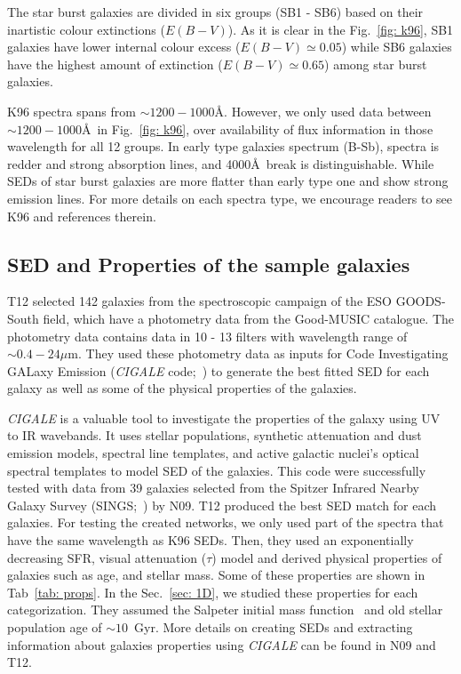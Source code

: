     The star burst galaxies are divided in six groups (SB1 - SB6) based on their inartistic colour extinctions ($E(B-V)$). 
    As it is clear in the Fig.~\ref{fig: k96}, SB1 galaxies have lower internal colour excess ($E(B-V) \simeq 0.05$) while SB6 galaxies have the highest amount of extinction ($E(B-V) \simeq 0.65$) among star burst galaxies.
    
    K96 spectra spans from $\sim1200-1000$\AA.
    However, we only used data between $\sim1200-1000$\AA~in Fig.~\ref{fig: k96}, over availability of flux information in those wavelength for all 12 groups.
    In early type galaxies spectrum (B-Sb), spectra is redder and strong absorption lines, and 4000\AA~break is distinguishable. 
    While SEDs of star burst galaxies are more flatter than early type one and show strong emission lines.
    For more details on each spectra type, we encourage readers to see K96 and references therein. 
    

 \subsection{SED and Properties of the sample galaxies}
    T12 selected 142 galaxies from the spectroscopic campaign of the ESO GOODS-South field, which have a photometry data from the Good-MUSIC catalogue. 
    The photometry data contains data in 10 - 13 filters with wavelength range of $\sim 0.4-24 \mu$m. 
    They used these photometry data as inputs for Code Investigating GALaxy Emission ({\em CIGALE} code;~\citep{Noll09}) to generate the best fitted SED for each galaxy as well as some of the physical properties of the galaxies.
    
    {\em CIGALE} is a valuable tool to investigate the properties of the galaxy using UV to IR wavebands.
    It uses stellar populations, synthetic attenuation and dust emission models, spectral line templates, and active galactic nuclei's optical spectral templates to model SED of the galaxies.
    This code were successfully tested with data from 39 galaxies selected from the Spitzer Infrared Nearby Galaxy Survey (SINGS;~\citep{Kennicutt03}) by N09.
    T12 produced the best SED match for each galaxies.
    For testing the created networks, we only used part of the spectra that have the same wavelength as K96 SEDs.
    Then, they used an exponentially decreasing SFR, visual attenuation ($\tau$) model and derived physical properties of galaxies such as age, and stellar mass.
    Some of these properties are shown in Tab~\ref{tab: props}.
    In the Sec.~\ref{sec: 1D}, we studied these properties for each categorization.
    They assumed the Salpeter initial mass function~\citep{Salpeter55} and old stellar population age of $\sim 10$~Gyr.
    More details on creating SEDs and extracting information about galaxies properties using {\em CIGALE} can be found in N09 and T12.
    
